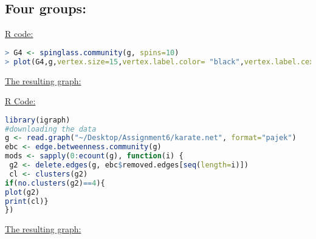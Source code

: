 \documentclass[letterpaper,11pt]{article}
\begin{document}
\subsection*{Four groups:}
\uline{R code:}\\
\begin{lstlisting}[language=R,frame=single]
> G4 <- spinglass.community(g, spins=10)
> plot(G4,g,vertex.size=15,vertex.label.color= "black",vertex.label.cex=0.45,layout=layout.fruchterman.reingold)
\end{lstlisting}
\uline{The resulting graph:}\\
\noindent
\begin{minipage}{\linewidth}
\label{visina8}
\end{minipage}
\newpage
\uline{R Code:}\\
\begin{lstlisting}[language=R,frame=single]
library(igraph)
#downloading the data
g <- read.graph("~/Desktop/Assignment6/karate.net", format="pajek")
ebc <- edge.betweenness.community(g)
mods <- sapply(0:ecount(g), function(i) {
 g2 <- delete.edges(g, ebc$removed.edges[seq(length=i)])
 cl <- clusters(g2)
if(no.clusters(g2)==4){
plot(g2)
print(cl)}
})
\end{lstlisting}

\uline{The resulting graph:}\\
\noindent
\begin{minipage}{\linewidth}
\label{visina8}
\end{minipage}
\newpage
\end{document}
